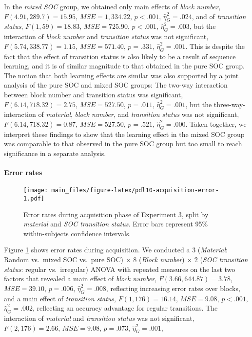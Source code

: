 \documentclass[man]{apa6}
\theoremstyle{definition}
\theoremstyle{definition}
\theoremstyle{definition}
\theoremstyle{remark}
\begin{document}
In the \emph{mixed SOC} group, we obtained only main effects of
\emph{block number}, \(F(4.91, 289.7) = 15.95\),
\(\mathit{MSE} = 1,334.22\), \(p < .001\), \(\hat{\eta}^2_G = .024\),
and of \emph{transition status}, \(F(1, 59) = 18.83\),
\(\mathit{MSE} = 725.90\), \(p < .001\), \(\hat{\eta}^2_G = .003\), but
the interaction of \emph{block number} and \emph{transition status} was
not significant, \(F(5.74, 338.77) = 1.15\), \(\mathit{MSE} = 571.40\),
\(p = .331\), \(\hat{\eta}^2_G = .001\). This is despite the fact that
the effect of transition status is also likely to be a result of
sequence learning, and it is of similar magnitude to that obtained in
the pure SOC group. The notion that both learning effects are similar
was also supported by a joint analysis of the pure SOC and mixed SOC
groups: The two-way interaction between block number and transition
status was significant, \(F(6.14, 718.32) = 2.75\),
\(\mathit{MSE} = 527.50\), \(p = .011\), \(\hat{\eta}^2_G = .001\), but
the three-way-interaction of \emph{material}, \emph{block number}, and
\emph{transition status} was not significant,
\(F(6.14, 718.32) = 0.87\), \(\mathit{MSE} = 527.50\), \(p = .521\),
\(\hat{\eta}^2_G = .000\). Taken together, we interpret these findings
to show that the learning effect in the mixed SOC group was comparable
to that observed in the pure SOC group but too small to reach
significance in a separate analysis.

\paragraph{Error rates}\label{error-rates-2}

\begin{figure}
\centering
\texttt{[image: main\_files/figure-latex/pdl10-acquisition-error-1.pdf]}
\caption{\label{fig:pdl10-acquisition-error}Error rates during acquisition
phase of Experiment 3, split by \emph{material} and \emph{SOC transition
status}. Error bars represent 95\% within-subjects confidence
intervals.}
\end{figure}

Figure \ref{fig:pdl10-acquisition-error} shows error rates during
acquisition. We conducted a 3 (\emph{Material}: Random vs.~mixed SOC
vs.~pure SOC) \(\times\) 8 (\emph{Block number}) \(\times\) 2 (\emph{SOC
transition status}: regular vs.~irregular) ANOVA with repeated measures
on the last two factors that revealed a main effect of \emph{block
number}, \(F(3.66, 644.87) = 3.78\), \(\mathit{MSE} = 39.10\),
\(p = .006\), \(\hat{\eta}^2_G = .008\), reflecting increasing error
rates over blocks, and a main effect of \emph{transition status},
\(F(1, 176) = 16.14\), \(\mathit{MSE} = 9.08\), \(p < .001\),
\(\hat{\eta}^2_G = .002\), reflecting an accuracy advantage for regular
transitions. The interaction of \emph{material} and \emph{transition
status} was not significant, \(F(2, 176) = 2.66\),
\(\mathit{MSE} = 9.08\), \(p = .073\), \(\hat{\eta}^2_G = .001\),
\end{document}
